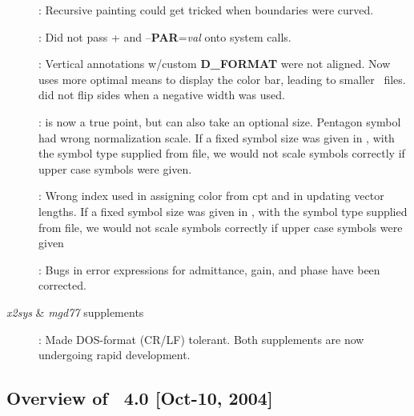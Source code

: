 \begin{description}
\item []: Recursive painting could get tricked when boundaries were curved.
\item []: Did not pass + and --\textbf{PAR}=\emph{val} onto system calls.
\item []: Vertical annotations w/custom \textbf{D\_FORMAT} were not aligned. Now uses more optimal means
to display the color bar, leading to smaller \PS\ files.   did not flip sides when a negative width was used.
\item []:  is now a true point, but can also take an optional size.  Pentagon symbol had wrong
normalization scale.  If a fixed symbol size was given in , with the symbol type supplied from file,
we would not scale symbols correctly if upper case symbols were given.
\item []: Wrong index used in assigning color from cpt and in updating vector lengths.  If a fixed symbol
size was given in , with the symbol type supplied from file,
we would not scale symbols correctly if upper case symbols were given
\item []: Bugs in error expressions for admittance, gain, and phase have been corrected.
\item [\emph{x2sys} \& \emph{mgd77} supplements]: Made DOS-format (CR/LF) tolerant.  Both supplements are now undergoing rapid
development.
\end{description}

\subsection{Overview of \gmt\ 4.0 [Oct-10, 2004]}

